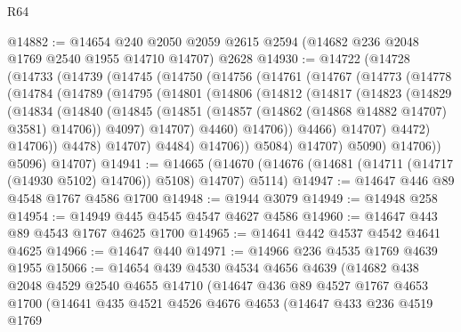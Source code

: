 \begin{lexlean}{R64}
\begin{coremodule}
@14882 := @14654
    @240
    @2050
    @2059
    @2615
    @2594
    (@14682 @236 @2048 @1769 @2540 @1955 @14710 @14707)
    @2628
@14930 := @14722
    (@14728
      (@14733
        (@14739
          (@14745
            (@14750
              (@14756
                (@14761
                  (@14767
                    (@14773
                      (@14778
                        (@14784
                          (@14789
                            (@14795
                              (@14801
                                (@14806
                                  (@14812
                                    (@14817
                                      (@14823
                                        (@14829
                                          (@14834
                                            (@14840
                                              (@14845
                                                (@14851
                                                  (@14857
                                                    (@14862 (@14868 @14882 @14707) @3581)
                                                    @14706))
                                                @4097)
                                              @14707)
                                            @4460)
                                          @14706))
                                      @4466)
                                    @14707)
                                  @4472)
                                @14706))
                            @4478)
                          @14707)
                        @4484)
                      @14706))
                  @5084)
                @14707)
              @5090)
            @14706))
        @5096)
      @14707)
@14941 := @14665
    (@14670 (@14676 (@14681 (@14711 (@14717 (@14930 @5102) @14706)) @5108) @14707) @5114)
@14947 := @14647 @446 @89 @4548 @1767 @4586 @1700
@14948 := @1944 @3079
@14949 := @14948 @258
@14954 := @14949 @445 @4545 @4547 @4627 @4586
@14960 := @14647 @443 @89 @4543 @1767 @4625 @1700
@14965 := @14641 @442 @4537 @4542 @4641 @4625
@14966 := @14647 @440
@14971 := @14966 @236 @4535 @1769 @4639 @1955
@15066 := @14654
    @439
    @4530
    @4534
    @4656
    @4639
    (@14682
      @438
      @2048
      @4529
      @2540
      @4655
      @14710
      (@14647
        @436
        @89
        @4527
        @1767
        @4653
        @1700
        (@14641
          @435
          @4521
          @4526
          @4676
          @4653
          (@14647
            @433
            @236
            @4519
            @1769

\end{coremodule}
\end{lexlean}
